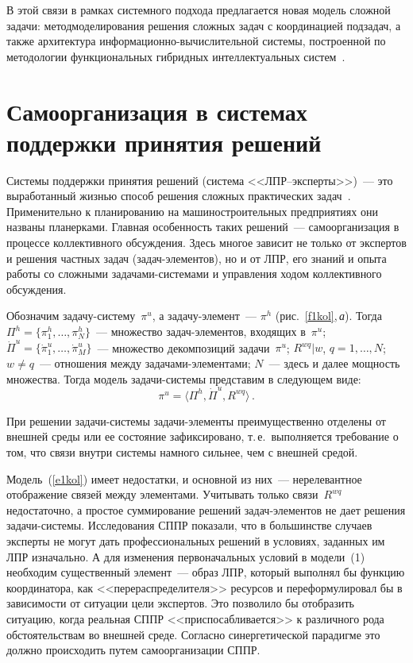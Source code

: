 \begin{multicols}{2}
  В этой связи в рамках системного подхода предлагается новая модель 
сложной задачи: метод\linebreak моделирования решения сложных задач с координацией 
подзадач, а также архитектура ин\-фор\-ма\-ци\-он\-но-вычислительной системы, 
построенной по методологии функциональных гибридных интеллектуальных 
систем~\cite{8kol}.
  
\section{Самоорганизация в системах поддержки принятия решений}
  
  Системы поддержки принятия решений (система <<ЛПР--эксперты>>)~--- это 
выработанный жизнью способ решения сложных практических 
задач~\cite{8kol}. Применительно к планированию на машиностроительных 
предприятиях они названы планерками. Главная особенность таких 
  решений~--- самоорганизация в процессе коллективного обсуждения. Здесь 
многое зависит не только от экспертов и решения частных задач 
  (за\-дач-эле\-мен\-тов), но и от ЛПР, его знаний и опыта работы со сложными 
за\-да\-ча\-ми-сис\-те\-ма\-ми и управления ходом коллективного обсуждения.
  
  Обозначим задачу-систему~$\pi^u$, а за\-да\-чу-эле\-мент~--- $\pi^h$ 
(рис.~\ref{f1kol},\,\textit{а}). Тогда $\Pi^h =\{\pi^h_1, \ldots , \pi^h_N\}$~--- 
множество за\-дач-эле\-мен\-тов, входящих в~$\pi^u$;\linebreak 
$\dot{\Pi}^u=\{\dot{\pi}_1^u,\ldots , \dot{\pi}^u_M\}$~--- множество 
декомпозиций задачи~$\pi^u$; $R^{wq}\vert w$, $q=1,\ldots ,N$; $w\not=q$~--- 
отношения между задачами-элементами; $N$~--- здесь и далее мощность 
множества. Тогда модель задачи-сис\-те\-мы представим в следующем виде:
  \begin{equation}
\pi^u =\langle \Pi^h, \dot{\Pi}^u, R^{wq}\rangle\,.
\label{e1kol}
\end{equation}
  
  При решении задачи-системы за\-да\-чи-эле\-мен\-ты преимущественно 
отделены от внешней среды или ее состояние зафиксировано, т.\,е.\ 
выполняется требование о том, что связи внутри системы намного сильнее, чем 
с внешней средой.
  

  
  Модель~(\ref{e1kol}) имеет недостатки, и основной из них~--- нерелевантное 
отображение связей между элементами. Учитывать только связи~$R^{wq}$ 
недостаточно, а простое суммирование решений за\-дач-эле\-мен\-тов не дает 
решения за\-да\-чи-сис\-те\-мы. Исследования СППР показали, что в 
большинстве случаев эксперты не могут дать профессиональных решений в 
условиях, заданных им ЛПР изначально. А для изменения первоначальных 
условий в модели~(1) необходим существенный элемент~--- образ ЛПР, 
который выполнял бы функцию координатора, как <<перераспределителя>> 
ресурсов и переформулировал бы в зависимости от ситуации цели экспертов. 
Это позволило бы отобразить ситуацию, когда реальная СППР 
<<приспосабливается>> к различного рода обстоятельствам во внешней среде. 
Согласно синергетической парадигме это должно  происходить путем 
самоорганизации СППР.
  

\end{multicols}
